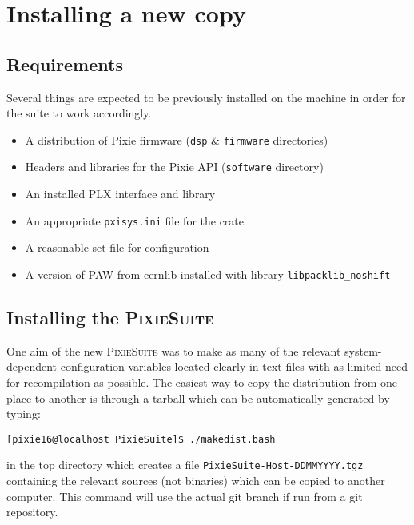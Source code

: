 \documentclass[10pt]{article}
\begin{document}
\section{\label{sec:install}Installing a new copy}
\subsection{Requirements}
Several things are expected to be previously installed on the machine in order for the suite to work accordingly.
\begin{itemize}
\item A distribution of Pixie firmware (\texttt{dsp} \& \texttt{firmware} directories)
\item Headers and libraries for the Pixie API (\texttt{software} directory)
\item An installed PLX interface and library
\item An appropriate \texttt{pxisys.ini} file for the crate
\item A reasonable set file for configuration
\item A version of PAW from cernlib installed with library \texttt{libpacklib\_noshift}
\end{itemize}
\subsection{Installing the \textsc{PixieSuite}}
One aim of the new \textsc{PixieSuite} was to make as many of the relevant system-dependent configuration variables located clearly in text files with as limited need for recompilation as possible. The easiest way to copy the distribution from one place to another is through a tarball which can be automatically generated by typing:
\begin{verbatim}
[pixie16@localhost PixieSuite]$ ./makedist.bash
\end{verbatim}
in the top directory which creates a file
\texttt{PixieSuite-Host-DDMMYYYY.tgz} containing the relevant sources (not
binaries) which can be copied to another computer. This command will use the
actual git branch if run from a git repository.
\end{document}
